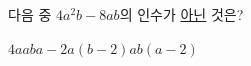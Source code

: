 다음 중 $4a^2b-8ab$의 인수가 \underline{아닌} 것은?
\begin{choices32}{$4a$}{$ab$}{$a-2$}{$a(b-2)$}{$ab(a-2)$}\end{choices32}
